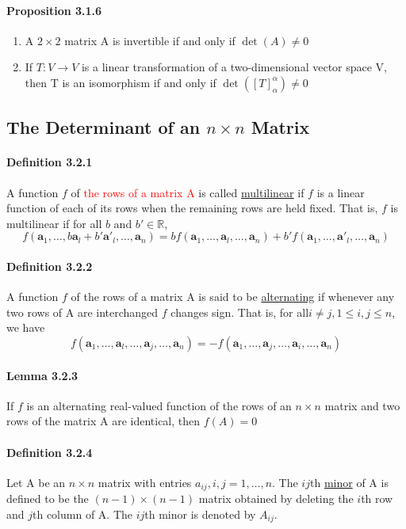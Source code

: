 \documentclass[11pt]{article}
\newcommand{\tb}[1]{\textbf{#1}}
\newcommand{\under}[1]{\underline{#1}}
\newcommand{\real}[0]{\mathbb{R}}
\newcommand{\va}[0]{\tb{a}}
\begin{document}
{\paragraph{Proposition 3.1.6}
\begin{enumerate}
	\item A $2\times 2$ matrix A is invertible if and only if $\det(A) \neq 0$
	\item If $T: V \rightarrow V$ is a linear transformation of a two-dimensional vector space V, then T is an isomorphism if and only if $\det([T]_\alpha ^\alpha) \neq 0$
\end{enumerate}
\subsection{The Determinant of an $n\times n$ Matrix}
\paragraph{Definition 3.2.1} A function $f$ of \textcolor{red}{the rows of a matrix A} is called \under{multilinear} if $f$ is a linear function of each of its rows when the remaining rows are held fixed. That is, $f$ is multilinear if for all $b$ and $b' \in \real$,
	$$f(\va_1,\hdots,b\va_l+b'\va'_l,\hdots,\va_n) = bf(\va_1,\hdots,\va_l,\hdots,\va_n)+ b'f(\va_1,\hdots,\va'_l,\hdots,\va_n)$$
\paragraph{Definition 3.2.2} A function $f$ of the rows of a matrix A is said to be \under{alternating} if whenever any two rows of A are interchanged $f$ changes sign. That is, for all$i \neq j, 1\leq i, j\leq n$, we have
$$f(\va_1,\hdots,\va_l,\hdots,\va_j,\hdots,\va_n) = -f(\va_1,\hdots,\va_j,\hdots,\va_i,\hdots,\va_n)$$
\paragraph{Lemma 3.2.3} If $f$ is an alternating real-valued function of the rows of an $n\times n$ matrix and two rows of the matrix A are identical, then $f(A) = 0$
\paragraph{Definition 3.2.4} Let A be an $n\times n$ matrix with entries $a_{ij}, i,j = 1,\hdots,n$. The $ij$th \under{minor} of A is defined to be the $(n-1)\times(n-1)$ matrix obtained by deleting the $i$th row and $j$th column of A. The $ij$th minor is denoted by $A_{ij}$.
}
\end{document}
